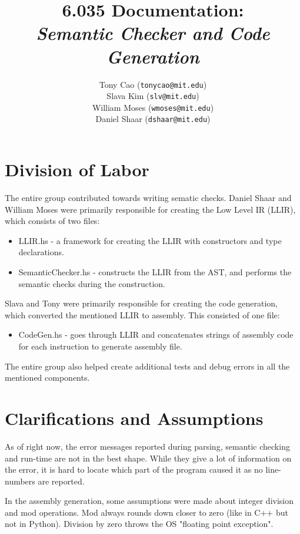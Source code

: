 \documentclass[11pt]{article}
\title{6.035 Documentation: \\ \emph{Semantic Checker and Code Generation}}
\author{Tony Cao (\texttt{tonycao@mit.edu}) \\
Slava Kim (\texttt{slv@mit.edu}) \\
William Moses (\texttt{wmoses@mit.edu}) \\
Daniel Shaar (\texttt{dshaar@mit.edu})}
\date{}
\begin{document}
\maketitle

\section{Division of Labor}

\par The entire group contributed towards writing sematic checks. Daniel Shaar and William Moses were primarily responsible for creating the Low Level IR (LLIR), which consists of two files:

\begin{itemize}
    \item LLIR.hs - a framework for creating the LLIR with constructors and type declarations.
    \item SemanticChecker.hs - constructs the LLIR from the AST, and performs the semantic checks during the construction.
\end{itemize}

\par Slava and Tony were primarily responsible for creating the code generation, which converted the mentioned LLIR to assembly. This consisted of one file:

\begin{itemize}
    \item CodeGen.hs - goes through LLIR and concatenates strings of assembly code for each instruction to generate assembly file.
\end{itemize}

\par The entire group also helped create additional tests and debug errors in all the mentioned components.

\section{Clarifications and Assumptions}

\par As of right now, the error messages reported during parsing, semantic checking and run-time are not in the best shape. While they give a lot of information on the error, it is hard to locate which part of the program caused it as no line-numbers are reported.

\par In the assembly generation, some assumptions were made about integer division and mod operations. Mod always rounds down closer to zero (like in C++ but not in Python). Division by zero throws the OS "floating point exception".
\end{document}
